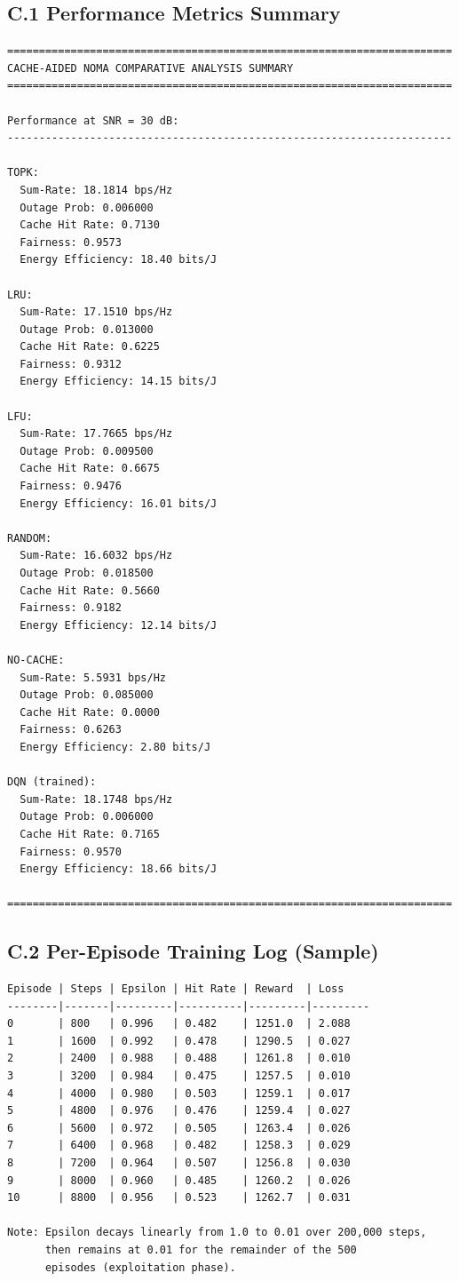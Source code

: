\documentclass[12pt,a4paper]{article}
\begin{document}
\subsection*{C.1 Performance Metrics Summary}

\begin{verbatim}
======================================================================
CACHE-AIDED NOMA COMPARATIVE ANALYSIS SUMMARY
======================================================================

Performance at SNR = 30 dB:
----------------------------------------------------------------------

TOPK:
  Sum-Rate: 18.1814 bps/Hz
  Outage Prob: 0.006000
  Cache Hit Rate: 0.7130
  Fairness: 0.9573
  Energy Efficiency: 18.40 bits/J

LRU:
  Sum-Rate: 17.1510 bps/Hz
  Outage Prob: 0.013000
  Cache Hit Rate: 0.6225
  Fairness: 0.9312
  Energy Efficiency: 14.15 bits/J

LFU:
  Sum-Rate: 17.7665 bps/Hz
  Outage Prob: 0.009500
  Cache Hit Rate: 0.6675
  Fairness: 0.9476
  Energy Efficiency: 16.01 bits/J

RANDOM:
  Sum-Rate: 16.6032 bps/Hz
  Outage Prob: 0.018500
  Cache Hit Rate: 0.5660
  Fairness: 0.9182
  Energy Efficiency: 12.14 bits/J

NO-CACHE:
  Sum-Rate: 5.5931 bps/Hz
  Outage Prob: 0.085000
  Cache Hit Rate: 0.0000
  Fairness: 0.6263
  Energy Efficiency: 2.80 bits/J

DQN (trained):
  Sum-Rate: 18.1748 bps/Hz
  Outage Prob: 0.006000
  Cache Hit Rate: 0.7165
  Fairness: 0.9570
  Energy Efficiency: 18.66 bits/J

======================================================================
\end{verbatim}

\subsection*{C.2 Per-Episode Training Log (Sample)}

\begin{verbatim}
Episode | Steps | Epsilon | Hit Rate | Reward  | Loss    
--------|-------|---------|----------|---------|---------
0       | 800   | 0.996   | 0.482    | 1251.0  | 2.088
1       | 1600  | 0.992   | 0.478    | 1290.5  | 0.027
2       | 2400  | 0.988   | 0.488    | 1261.8  | 0.010
3       | 3200  | 0.984   | 0.475    | 1257.5  | 0.010
4       | 4000  | 0.980   | 0.503    | 1259.1  | 0.017
5       | 4800  | 0.976   | 0.476    | 1259.4  | 0.027
6       | 5600  | 0.972   | 0.505    | 1263.4  | 0.026
7       | 6400  | 0.968   | 0.482    | 1258.3  | 0.029
8       | 7200  | 0.964   | 0.507    | 1256.8  | 0.030
9       | 8000  | 0.960   | 0.485    | 1260.2  | 0.026
10      | 8800  | 0.956   | 0.523    | 1262.7  | 0.031

Note: Epsilon decays linearly from 1.0 to 0.01 over 200,000 steps,
      then remains at 0.01 for the remainder of the 500
      episodes (exploitation phase).
\end{verbatim}

\thispagestyle{plain}
\end{document}
